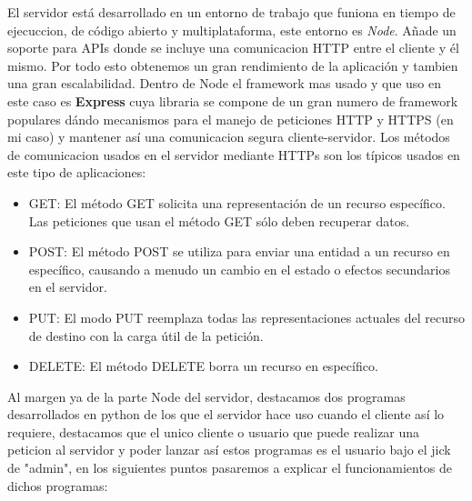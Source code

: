\documentclass[a4paper, 12pt]{book}
\begin{document}
	El servidor está desarrollado en un entorno de trabajo que funiona en tiempo de ejecuccion, de código abierto y multiplataforma, este entorno es \textit{Node}. Añade un soporte para APIs donde se incluye una comunicacion HTTP entre el cliente y él mismo. Por todo esto obtenemos un gran rendimiento de la aplicación y tambien una gran escalabilidad. Dentro de Node el framework mas usado y que uso en este caso es \textbf{Express} cuya libraria se compone de un gran numero de framework populares dándo mecanismos para el manejo de peticiones HTTP y HTTPS (en mi caso) y mantener así una comunicacion segura cliente-servidor. 
	Los métodos de comunicacion usados en el servidor mediante HTTPs son los típicos usados en este tipo de aplicaciones:
	\begin{itemize}
  	\item GET: El método GET  solicita una representación de un recurso específico. Las peticiones que usan el método GET sólo deben recuperar datos.
  	\item POST: El método POST se utiliza para enviar una entidad a un recurso en específico, causando a menudo un cambio en el estado o efectos secundarios en el servidor.
  	\item PUT: El modo PUT reemplaza todas las representaciones actuales del recurso de destino con la carga útil de la petición.
  	\item DELETE: El método DELETE borra un recurso en específico.
	\end{itemize}

Al margen ya de la parte Node del servidor, destacamos dos programas desarrollados en python de los que el servidor hace uso cuando el cliente así lo requiere, destacamos que el unico cliente o usuario que puede realizar una peticion al servidor y poder lanzar así estos programas es el usuario bajo el jick de "admin", en los siguientes puntos pasaremos a explicar el funcionamientos de dichos programas:
\end{document}
